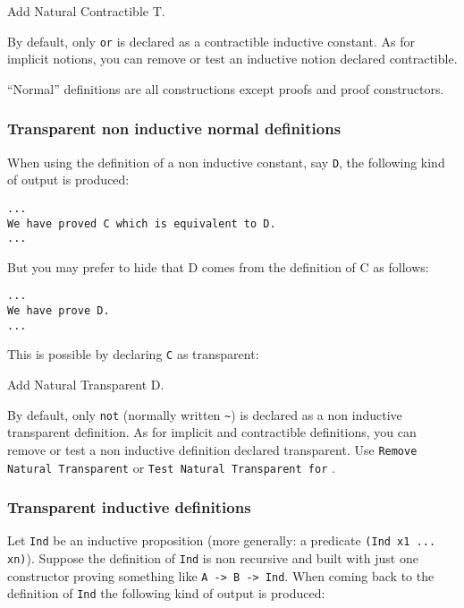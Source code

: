 \begin{coq_example*}
Add Natural Contractible T.
\end{coq_example*}

By default, only \verb=or= is declared as a contractible inductive
constant.
As for implicit notions, you can remove or test an inductive notion declared
contractible.


``Normal'' definitions are all constructions except proofs and proof constructors.

\subsubsection*{Transparent non inductive normal definitions}

When using the definition of a non inductive constant, say \verb=D=, the
following kind of output is produced:

\begin{verbatim}
...
We have proved C which is equivalent to D.
...
\end{verbatim}

But you may prefer to hide that D comes from the definition of C as
follows:

\begin{verbatim}
...
We have prove D.
...
\end{verbatim}

This is possible by declaring \verb=C= as transparent:

\begin{coq_example*}
Add Natural Transparent D.
\end{coq_example*}

By default, only \verb=not= (normally written \verb=~=) is declared as
a non inductive transparent definition.
As for implicit and contractible definitions, you can remove or test a
non inductive definition declared transparent.
Use \texttt{Remove Natural Transparent} \ident or 
\texttt{Test Natural Transparent for} \ident.

\subsubsection*{Transparent inductive definitions}

Let \verb=Ind= be an inductive proposition (more generally: a
predicate \verb=(Ind x1 ... xn)=). Suppose the definition of
\verb=Ind= is non recursive and built with just
one constructor proving something like \verb=A -> B -> Ind=.
When coming back to the definition of \verb=Ind= the
following kind of output is produced:

